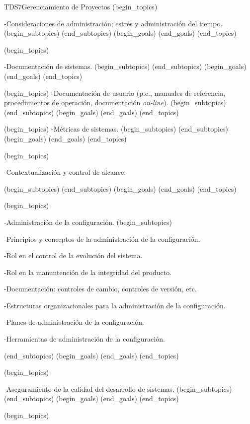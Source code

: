 \begin{BKL2}{TDS7}{Gerenciamiento de Proyectos}
(begin_topics)

-Consideraciones de administración; estrés y administración del tiempo.
(begin_subtopics)
(end_subtopics)
(begin_goals)
(end_goals)
(end_topics)

 

(begin_topics)

-Documentación de sistemas.
(begin_subtopics)
(end_subtopics)
(begin_goals)
(end_goals)
(end_topics)

 

(begin_topics)
-Documentación de usuario (p.e., manuales de referencia, procedimientos de operación, documentación {\it on-line}).
(begin_subtopics)
(end_subtopics)
(begin_goals)
(end_goals)
(end_topics)

 

(begin_topics)
-Métricas de sistemas.
(begin_subtopics)
(end_subtopics)
(begin_goals)
(end_goals)
(end_topics)

 

(begin_topics)

-Contextualización y control de alcance.

(begin_subtopics)
(end_subtopics)
(begin_goals)
(end_goals)
(end_topics)

 

(begin_topics)

-Administración de la configuración.
(begin_subtopics)

-Principios y conceptos de la administración de la configuración.

-Rol en el control de la evolución del sistema.

-Rol en la manuntención de la integridad del producto.

-Documentación: controles de cambio, controles de versión, etc.

-Estructuras organizacionales para la administración de la configuración.

-Planes de administración de la configuración.

-Herramientas de administración de la configuración.

(end_subtopics)
(begin_goals)
(end_goals)
(end_topics)

 

(begin_topics)

-Aseguramiento de la calidad del desarrollo de sistemas.
(begin_subtopics)
(end_subtopics)
(begin_goals)
(end_goals)
(end_topics)

 

(begin_topics)


\end{BKL2}
